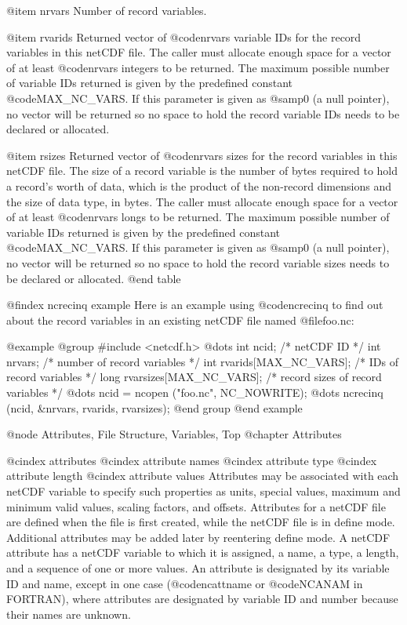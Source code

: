 @item nrvars
Number of record variables.

@item rvarids
Returned vector of @code{nrvars} variable IDs for the record variables
in this netCDF file.  The caller must allocate enough space for a vector
of at least @code{nrvars} integers to be returned.  The maximum possible
number of variable IDs returned is given by the predefined constant
@code{MAX_NC_VARS}.  If this parameter is given as @samp{0} (a null pointer), no
vector will be returned so no space to hold the record variable IDs
needs to be declared or allocated.

@item rsizes
Returned vector of @code{nrvars} sizes for the record variables in this
netCDF file.  The size of a record variable is the number of bytes
required to hold a record's worth of data, which is the product of the
non-record dimensions and the size of data type, in bytes.  The caller
must allocate enough space for a vector of at least @code{nrvars} longs
to be returned.  The maximum possible number of variable IDs returned is
given by the predefined constant @code{MAX_NC_VARS}.  If this parameter
is given as @samp{0} (a null pointer), no vector will be returned so no space to
hold the record variable sizes needs to be declared or allocated.
@end table

@findex ncrecinq example
Here is an example using @code{ncrecinq} to find out about the record
variables in an existing netCDF file named @file{foo.nc}:

@example
@group
#include <netcdf.h>
   @dots{}
int  ncid;                     /* netCDF ID */
int  nrvars;                   /* number of record variables */
int  rvarids[MAX_NC_VARS];     /* IDs of record variables */
long rvarsizes[MAX_NC_VARS];   /* record sizes of record variables */
   @dots{}
ncid = ncopen ("foo.nc", NC_NOWRITE);
   @dots{}
ncrecinq (ncid, &nrvars, rvarids, rvarsizes);
@end group
@end example

@node Attributes, File Structure, Variables, Top
@chapter Attributes

@cindex attributes
@cindex attribute names
@cindex attribute type
@cindex attribute length
@cindex attribute values
Attributes may be associated with each netCDF variable to specify such
properties as units, special values, maximum and minimum valid values,
scaling factors, and offsets.  Attributes for a netCDF file are
defined when the file is first created, while the netCDF file is in define
mode.  Additional attributes may be added later by reentering define
mode.  A netCDF attribute has a netCDF variable to which it is assigned,
a name, a type, a length, and a sequence of one or more values.  An
attribute is designated by its variable ID and name, except in one case
(@code{ncattname} or @code{NCANAM} in FORTRAN), where attributes are
designated by variable ID and number because their names are unknown.

